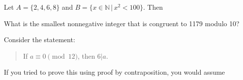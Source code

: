 \documentclass[addpoints]{exam}
\begin{document}
\begin{questions}
\question[2] Let $A = \{ 2, 4, 6, 8\}$ and $B = \{ x \in \mathbb{N} \, | \, x^2 < 100 \}$. Then

\question[2] What is the smallest nonnegative integer that is congruent to 1179 modulo 10?

\question[2] 	Consider the statement:
	\begin{quote}
		If $a \equiv 0 \pmod {12}$, then $6 | a$. 
	\end{quote}
If you tried to prove this using proof by contraposition, you would assume
\end{questions}
\end{document}
